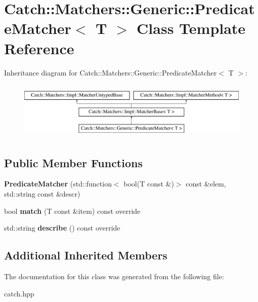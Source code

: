 \hypertarget{class_catch_1_1_matchers_1_1_generic_1_1_predicate_matcher}{}\section{Catch\+:\+:Matchers\+:\+:Generic\+:\+:Predicate\+Matcher$<$ T $>$ Class Template Reference}
\label{class_catch_1_1_matchers_1_1_generic_1_1_predicate_matcher}
Inheritance diagram for Catch\+:\+:Matchers\+:\+:Generic\+:\+:Predicate\+Matcher$<$ T $>$\+:\begin{figure}[H]
\begin{center}
\leavevmode
\includegraphics[height=2.790698cm]{class_catch_1_1_matchers_1_1_generic_1_1_predicate_matcher}
\end{center}
\end{figure}
\subsection*{Public Member Functions}
\begin{DoxyCompactItemize}
\item 
\mbox{\label{class_catch_1_1_matchers_1_1_generic_1_1_predicate_matcher_a57d53ef028c2f7b92b016f627f91aa76}} 
{\bfseries Predicate\+Matcher} (std\+::function$<$ bool(T const \&)$>$ const \&elem, std\+::string const \&descr)
\item 
\mbox{\label{class_catch_1_1_matchers_1_1_generic_1_1_predicate_matcher_a2ec0e8ec19c4c5e26271d59a06a62b52}} 
bool {\bfseries match} (T const \&item) const override
\item 
\mbox{\label{class_catch_1_1_matchers_1_1_generic_1_1_predicate_matcher_af7d59e94892cc09471bbaefac4c889fd}} 
std\+::string {\bfseries describe} () const override
\end{DoxyCompactItemize}
\subsection*{Additional Inherited Members}


The documentation for this class was generated from the following file\+:\begin{DoxyCompactItemize}
\item 
catch.\+hpp\end{DoxyCompactItemize}
